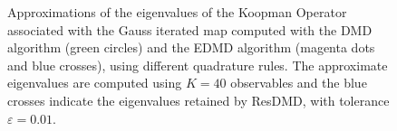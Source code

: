 \begin{figure}[h]
{    \hspace*{\fill}
}
\caption{Approximations of the eigenvalues of the Koopman Operator associated with the Gauss iterated map computed with the DMD algorithm (green circles) and the EDMD algorithm (magenta dots and blue crosses), using different quadrature rules. The approximate eigenvalues are computed using $K=40$ observables and the blue crosses indicate the eigenvalues retained by ResDMD, with tolerance $\varepsilon = 0.01$.}
\label{fig_resdmd_quadrature_comparison}
\end{figure}

\begin{figure}[h]
\end{figure}
